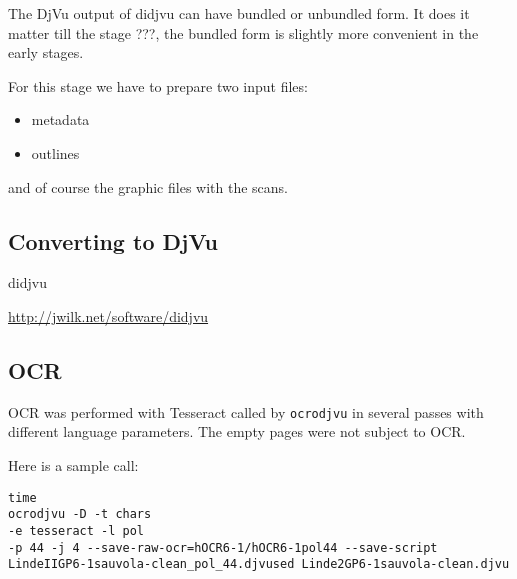 \documentclass{article}
\begin{document}
The DjVu output of didjvu can have bundled or unbundled form. It does
it matter till the stage ???, the bundled form is slightly more
convenient in the early stages.


For this stage we have to prepare two input files:
\begin{itemize}
\item metadata
\item outlines
\end{itemize}
and of course the graphic files with the scans.

\subsection{Converting to DjVu}
\label{sec:converting-djvu}




didjvu

\url{http://jwilk.net/software/didjvu}


\subsection{OCR}
\label{sec:ocr}

OCR was performed with Tesseract called by \texttt{ocrodjvu} in
several passes with different language parameters. The empty pages
were not subject to OCR.

Here is a sample call:

\begin{verbatim}
time 
ocrodjvu -D -t chars 
-e tesseract -l pol 
-p 44 -j 4 --save-raw-ocr=hOCR6-1/hOCR6-1pol44 --save-script LindeIIGP6-1sauvola-clean_pol_44.djvused Linde2GP6-1sauvola-clean.djvu
\end{verbatim}
\end{document}
